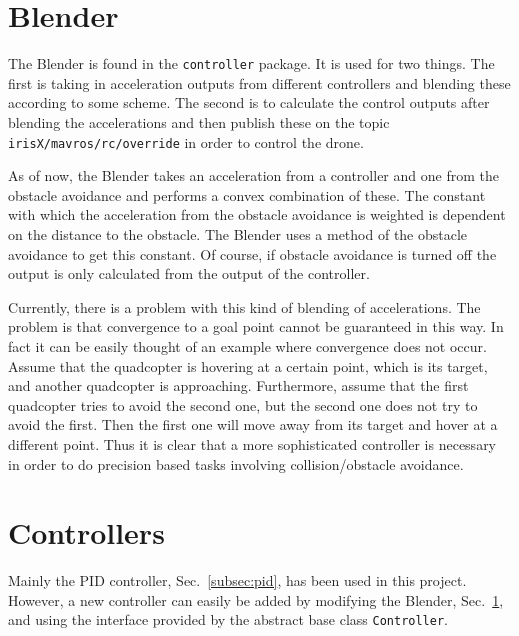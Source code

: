 \documentclass[titlepage,11pt,a4paper]{article}
\begin{document}
\section{Blender}
\label{sec:blender}

The Blender is found in the \texttt{controller} package. It is used
for two things. The first is taking in acceleration outputs from
different controllers and blending these according to some scheme. The
second is to calculate the control outputs after blending the
accelerations and then publish these on the topic
\texttt{irisX/mavros/rc/override} in order to control the drone.

As of now, the Blender takes an acceleration from a controller and one
from the obstacle avoidance and performs a convex combination of
these. The constant with which the acceleration from the obstacle
avoidance is weighted is dependent on the distance to the
obstacle. The Blender uses a method of the obstacle avoidance to get
this constant. Of course, if obstacle avoidance is turned off the
output is only calculated from the output of the controller.

Currently, there is a problem with this kind of blending of
accelerations. The problem is that convergence to a goal point cannot
be guaranteed in this way. In fact it can be easily thought of an
example where convergence does not occur. Assume that the quadcopter
is hovering at a certain point, which is its target, and another
quadcopter is approaching. Furthermore, assume that the first
quadcopter tries to avoid the second one, but the second one does not
try to avoid the first. Then the first one will move away from its
target and hover at a different point. Thus it is clear that a more
sophisticated controller is necessary in order to do precision based
tasks involving collision/obstacle avoidance.


\section{Controllers}
\label{sec:controllers}
Mainly the PID controller, Sec.~\ref{subsec:pid}, has been used in
this project. However, a new controller can easily be added by
modifying the Blender, Sec.~\ref{sec:blender}, and using the interface
provided by the abstract base class \texttt{Controller}.
\end{document}
